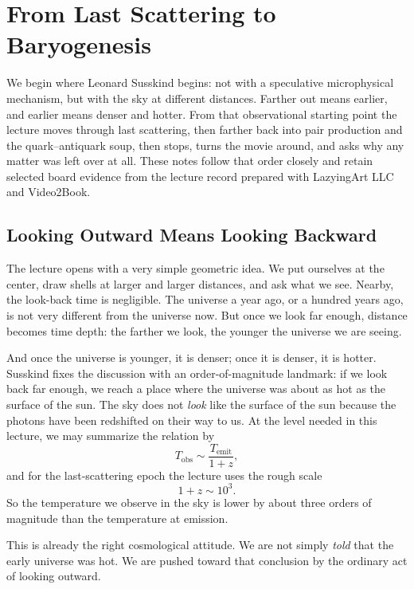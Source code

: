 \chapter{From Last Scattering to Baryogenesis}

We begin where Leonard Susskind begins: not with a speculative microphysical mechanism, but with the sky at different distances. Farther out means earlier, and earlier means denser and hotter. From that observational starting point the lecture moves through last scattering, then farther back into pair production and the quark--antiquark soup, then stops, turns the movie around, and asks why any matter was left over at all. These notes follow that order closely and retain selected board evidence from the lecture record prepared with LazyingArt LLC and Video2Book.

\section{Looking Outward Means Looking Backward}

The lecture opens with a very simple geometric idea. We put ourselves at the center, draw shells at larger and larger distances, and ask what we see. Nearby, the look-back time is negligible. The universe a year ago, or a hundred years ago, is not very different from the universe now. But once we look far enough, distance becomes time depth: the farther we look, the younger the universe we are seeing.

And once the universe is younger, it is denser; once it is denser, it is hotter. Susskind fixes the discussion with an order-of-magnitude landmark: if we look back far enough, we reach a place where the universe was about as hot as the surface of the sun. The sky does not \emph{look} like the surface of the sun because the photons have been redshifted on their way to us. At the level needed in this lecture, we may summarize the relation by
\begin{equation}
T_{\mathrm{obs}} \sim \frac{T_{\mathrm{emit}}}{1+z},
\end{equation}
and for the last-scattering epoch the lecture uses the rough scale
\begin{equation}
1+z \sim 10^3.
\end{equation}
So the temperature we observe in the sky is lower by about three orders of magnitude than the temperature at emission.

This is already the right cosmological attitude. We are not simply \emph{told} that the early universe was hot. We are pushed toward that conclusion by the ordinary act of looking outward.

